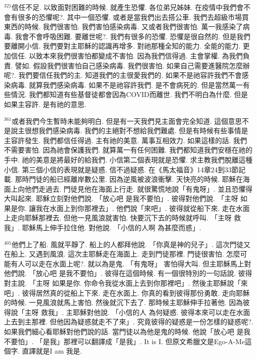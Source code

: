 \documentclass{book}
\begin{document}
$^{321}$信任不足.
以致面對困難的時候.
就產生恐懼.
各位弟兄姊妹.
在疫情中我們會不會有很多的恐懼呢?.
其中一個恐懼.
或者是當我們出去搭公車.
我們去超級市場買東西的時候.
我們很害怕.
我們害怕感染病毒.
又或者我們很害怕.
萬一我感染了病毒.
我會不會呼吸困難.
要離世呢?.
我們有很多的恐懼.
恐懼是很自然的.
但是我們要離開小信.
我們要對主耶穌的認識再增多.
對祂那種全知的能力.
全能的能力.
更加信任.
以致本來我們很害怕都變成不害怕.
因為我們信得過.
主會掌權.
為我們負責.
譬如.
假設我們很害怕自己感染病毒.
我們很害怕.
如果自己需要進醫院怎麼辦呢?.
我們要信任我們的主.
知道我們的主很愛我們的.
如果不是祂容許我們不會感染病毒.
就算我們感染病毒.
如果不是祂容許我們.
是不會病死的.
但是當然萬一有些情況.
我們都知道有些基督徒都會因為COVID而離世.
我們不明白為什麼.
但是如果主容許.
是有祂的意思.

$^{361}$或者我們今生暫時未能夠明白.
但是有一天我們見主面會完全知道.
這個意思不是說主很想我們感染病毒.
我們的主絕對不想給我們難處.
但是有時候有些事情是主容許發生.
我們都信任得過.
主有祂的美意.
萬事互相效力.
如果這樣的話.
我們不需要害怕.
因為祂會保護我們.
就算萬一有任何困難.
我們都知道我們安穩在祂的手中.
祂的美意是將最好的給我們.
小信第二個表現就是恐懼.
求主教我們脫離這種小信.
第三個小信的表現就是疑惑.
信不過疑惑.
在《馬太福音》14章24到33節記載.
那時門徒的船已經離岸數公里.
因為逆風被波浪衝擊.
天快亮的時候.
耶穌在海面上向他們走過去.
門徒見他在海面上行走.
就很驚慌地說「有鬼呀」.
並且恐懼得大叫起來.
耶穌立刻對他們說.
「放心吧 是我不要怕」.
彼得對他們說.
「主呀 如果是你.
讓我在水面上到你那裡去」.
他們說「來吧」.
彼得就從船下來.
走在水面上走向耶穌那裡去.
但他一見風浪就害怕.
快要沉下去的時候就呼叫.
「主呀 救我」.
耶穌馬上伸手拉住他.
對他說.
「小信的人啊 為甚麼而惑」.

$^{401}$他們上了船.
風就平靜了.
船上的人都拜他說.
「你真是神的兒子」.
這次門徒又在船上.
又遇到風浪.
這次主耶穌走在海面上.
走到門徒那裡.
門徒很害怕.
怎麼可能有人可以走在水面上呢?.
就以為是鬼.
「有鬼呀」 害怕得大叫.
但主耶穌馬上對他們說.
「放心吧 是我不要怕」.
彼得在這個時候.
有一個很特別的一句話說.
彼得對主說.
「主呀 如果是你.
你命令我從水面上去到你那裡吧」.
然後主耶穌說「來吧」.
彼得居然真的從船上下來.
走在水面上.
你真的看到彼得那份勇敢.
走向耶穌的時候.
一見風浪就馬上害怕.
然後就沉下去了.
那時候主耶穌伸手拉著他.
因為彼得說「主呀 救我」.
主耶穌對他說.
「小信的人 為何疑惑.
彼得本來可以走在水面上去到主那裡.
但他因為疑惑就走不了來」.
究竟彼得的疑惑是一份怎樣的疑惑呢?.
如果我們細心看耶穌對他們說的話.
當門徒以為他是鬼的時候.
他說「放心吧 是我不要怕」.
「是我」那裡可以翻譯成「是我」.
It is I.
但原文希臘文是Ego-A-Me這個字.
直譯就是I am 我是.
\end{document}
